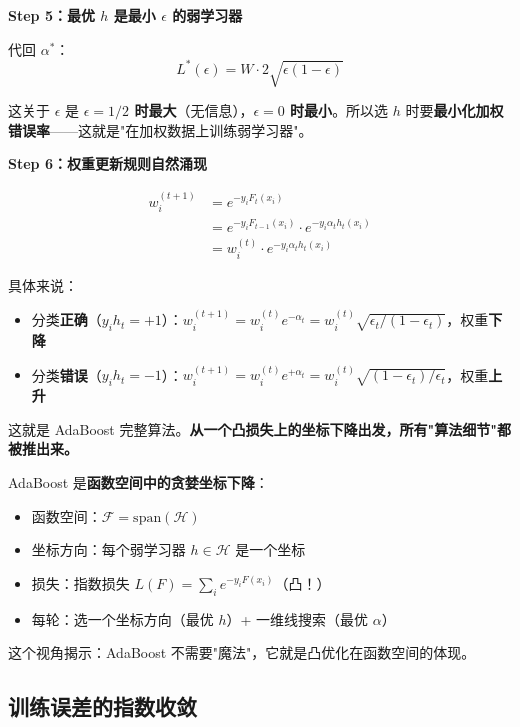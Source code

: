 \documentclass[12pt, a4paper]{ctexart}
\begin{document}
\begin{blackboard}
\textbf{Step 5：最优 $h$ 是最小 $\epsilon$ 的弱学习器}

代回 $\alpha^*$：
\[
L^*(\epsilon) = W \cdot 2\sqrt{\epsilon(1-\epsilon)}
\]

这关于 $\epsilon$ 是 \textbf{$\epsilon = 1/2$ 时最大}（无信息），\textbf{$\epsilon = 0$ 时最小}。所以选 $h$ 时要\textbf{最小化加权错误率}——这就是"在加权数据上训练弱学习器"。

\textbf{Step 6：权重更新规则自然涌现}

\begin{align*}
w_i^{(t+1)} &= e^{-y_i F_t(x_i)} \\
&= e^{-y_i F_{t-1}(x_i)} \cdot e^{-y_i \alpha_t h_t(x_i)} \\
&= w_i^{(t)} \cdot e^{-y_i \alpha_t h_t(x_i)}
\end{align*}

具体来说：
\begin{itemize}
\item 分类\textbf{正确}（$y_i h_t = +1$）：$w_i^{(t+1)} = w_i^{(t)} e^{-\alpha_t} = w_i^{(t)}\sqrt{\epsilon_t/(1-\epsilon_t)}$，权重\textbf{下降}
\item 分类\textbf{错误}（$y_i h_t = -1$）：$w_i^{(t+1)} = w_i^{(t)} e^{+\alpha_t} = w_i^{(t)}\sqrt{(1-\epsilon_t)/\epsilon_t}$，权重\textbf{上升}
\end{itemize}

这就是 AdaBoost 完整算法。\textbf{从一个凸损失上的坐标下降出发，所有"算法细节"都被推出来。}

\end{blackboard}

\begin{keypoint}
AdaBoost 是\textbf{函数空间中的贪婪坐标下降}：

\begin{itemize}
    \item 函数空间：$\mathcal{F} = \text{span}(\mathcal{H})$
    \item 坐标方向：每个弱学习器 $h \in \mathcal{H}$ 是一个坐标
    \item 损失：指数损失 $L(F) = \sum_i e^{-y_i F(x_i)}$（凸！）
    \item 每轮：选一个坐标方向（最优 $h$）+ 一维线搜索（最优 $\alpha$）
\end{itemize}

这个视角揭示：AdaBoost 不需要"魔法"，它就是凸优化在函数空间的体现。
\end{keypoint}

\subsection{训练误差的指数收敛}
\end{document}
